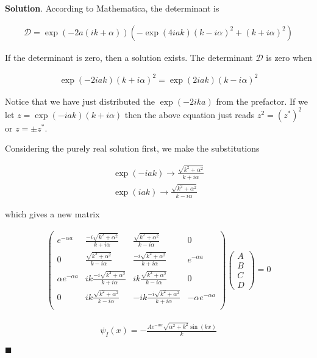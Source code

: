 \documentclass[12pt]{article}
\theoremstyle{definition}
\newenvironment{s}{%
        \begin{trivlist} \item \textbf{Solution}. }{%
            \hspace*{\fill} $\blacksquare$\end{trivlist}}%
\begin{document}
{\begin{s}
According to Mathematica, the determinant is 

\begin{align*}
\mathcal{D} = \exp(-2a(ik+\alpha))\left(-\exp(4iak)(k-i\alpha)^{2} + (k+i\alpha)^{2}\right)
\end{align*}

If the determinant is zero, then a solution exists. The determinant $\mathcal{D}$ is zero when

\begin{align*}
\exp(-2iak)(k+i\alpha)^{2} = \exp(2iak)(k-i\alpha)^{2}
\end{align*}

Notice that we have just distributed the $\exp(-2ika)$ from the prefactor. If we let $z = \exp(-iak)(k+i\alpha)$ then the above equation just reads $z^{2} = (z^{*})^{2}$ or $z = \pm z^{*}$. 

Considering the purely real solution first, we make the substitutions

\begin{align*}
\exp(-iak) \rightarrow \frac{\sqrt{k^{2} + \alpha^{2}}}{k+i\alpha}\\
\exp(iak) \rightarrow \frac{\sqrt{k^{2} + \alpha^{2}}}{k-i\alpha}
\end{align*}

which gives a new matrix 

\begin{align*}
\begin{pmatrix}
e^{-\alpha a} & \frac{-i\sqrt{k^{2} + \alpha^{2}}}{k+i\alpha} & \frac{\sqrt{k^{2} + \alpha^{2}}}{k-i\alpha} & 0\\
0 & \frac{\sqrt{k^{2} + \alpha^{2}}}{k-i\alpha} & \frac{-i\sqrt{k^{2} + \alpha^{2}}}{k+i\alpha} & e^{-\alpha a}\\
\alpha e^{-\alpha a} & ik\frac{-i\sqrt{k^{2} + \alpha^{2}}}{k+i\alpha} & ik\frac{\sqrt{k^{2} + \alpha^{2}}}{k-i\alpha} & 0\\
0 & ik\frac{\sqrt{k^{2} + \alpha^{2}}}{k-i\alpha} & -ik\frac{-i\sqrt{k^{2} + \alpha^{2}}}{k+i\alpha} & -\alpha e^{-\alpha a}\\
\end{pmatrix}\begin{pmatrix}A\\B\\C\\D\end{pmatrix} = 0
\end{align*}
 

\begin{align*}
\psi_{I}(x) = -\frac{A e^{-a \alpha } \sqrt{\alpha ^2+k^2} \sin (k x)}{k}
\end{align*}


\end{s}}
\end{document}
